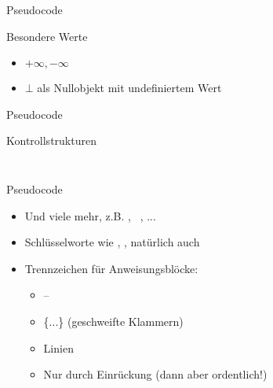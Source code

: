 \begin{frame} {Pseudocode}
	\begin{exampleblock}{Besondere Werte}
		\begin{itemize}
			\item $+\infty, -\infty$
			\item $\bot$ als Nullobjekt mit undefiniertem Wert
		\end{itemize}
	\end{exampleblock}
\end{frame}


\begin{frame} {Pseudocode}
	\begin{exampleblock}{Kontrollstrukturen}
		\begin{columns}
			\begin{column}{0.45\textwidth}
				\begin{algorithm}[H]
					 {
						 \;
					}  \; %
					 {
						 \;
					} {
						 \;
					} \; %
					 {
						 \;
					}
				\end{algorithm}
			\end{column}
			\begin{column}{0.45\textwidth}
				\begin{algorithm}[H]
					 \;
					\;
					\;   %
					\;
					\vspace{-4pt}
					\;
					\;
					 {
						 \;
					}
			\end{algorithm}
			\end{column}
		\end{columns}
		
\end{exampleblock}
\end{frame}


\begin{frame}{Pseudocode}
	\begin{itemize}
		\large
		\item Und viele mehr, z.B. , \KwFor\ \KwEach, ...
		\item Schlüsselworte wie \KwContinue, \KwBreak,  natürlich auch
		\item Trennzeichen für Anweisungsblöcke:\\
		\begin{itemize}
			\item {} -- 
			\item \{...\} \quad  (geschweifte Klammern)
			\item Linien
			\item Nur durch Einrückung (dann aber ordentlich!)
		\end{itemize}
	\end{itemize}
\end{frame}


